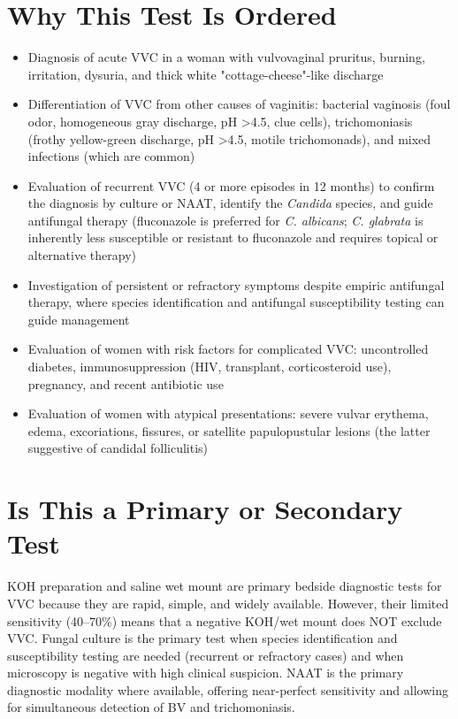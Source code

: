 \section*{Why This Test Is Ordered}
\begin{itemize}
  \item Diagnosis of acute VVC in a woman with vulvovaginal pruritus, burning, irritation, dysuria, and thick white "cottage-cheese"-like discharge
  \item Differentiation of VVC from other causes of vaginitis: bacterial vaginosis (foul odor, homogeneous gray discharge, pH >4.5, clue cells), trichomoniasis (frothy yellow-green discharge, pH >4.5, motile trichomonads), and mixed infections (which are common)
  \item Evaluation of recurrent VVC (4 or more episodes in 12 months) to confirm the diagnosis by culture or NAAT, identify the \textit{Candida} species, and guide antifungal therapy (fluconazole is preferred for \textit{C. albicans}; \textit{C. glabrata} is inherently less susceptible or resistant to fluconazole and requires topical or alternative therapy)
  \item Investigation of persistent or refractory symptoms despite empiric antifungal therapy, where species identification and antifungal susceptibility testing can guide management
  \item Evaluation of women with risk factors for complicated VVC: uncontrolled diabetes, immunosuppression (HIV, transplant, corticosteroid use), pregnancy, and recent antibiotic use
  \item Evaluation of women with atypical presentations: severe vulvar erythema, edema, excoriations, fissures, or satellite papulopustular lesions (the latter suggestive of candidal folliculitis)
\end{itemize}

\section*{Is This a Primary or Secondary Test}
KOH preparation and saline wet mount are primary bedside diagnostic tests for VVC because they are rapid, simple, and widely available. However, their limited sensitivity (40--70\%) means that a negative KOH/wet mount does NOT exclude VVC. Fungal culture is the primary test when species identification and susceptibility testing are needed (recurrent or refractory cases) and when microscopy is negative with high clinical suspicion. NAAT is the primary diagnostic modality where available, offering near-perfect sensitivity and allowing for simultaneous detection of BV and trichomoniasis.

